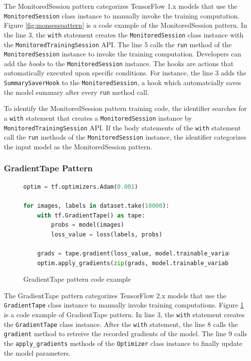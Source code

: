 The MonitoredSession pattern categorizes TensorFlow 1.x models that
use the {\tt MonitoredSession} class instance to manually invoke the 
training computation.
Figure \ref{fig:monsesspattern} is a code example of the MonitoredSession 
pattern.
In the line 3, the {\tt with} statement creates the {\tt MonitoredSession}
class instance with the {\tt MonitoredTrainingSession} API.
The line 5 calls the {\tt run} method of the {\tt MonitoredSession} instance 
to invoke the training computation.
Developers can add the \textit{hooks} to the
{\tt MonitoredSession} instance. The hooks are actions that automatically 
executed upon specific conditions. 
For instance, the line 3 adds the {\tt SummarySaverHook} to the
{\tt MonitoredSession}, a hook which automatcially saves the model summary 
after every {\tt run} method call.

To identify the MonitoredSession pattern training code,
the identifier searches for a {\tt with} statement that creates a
{\tt MonitoredSession} instance by {\tt MonitoredTrainingSession} API.
If the body statements of the {\tt with} statement call the {\tt run} methods 
of the {\tt MonitoredSession} instance, 
the identifier categorizes the input model as the MonitoredSession pattern. 


\subsubsection{GradientTape Pattern}

\begin{figure}[!ht]
  \begin{lstlisting}[language=Python]
optim = tf.optimizers.Adam(0.001)

for images, labels in dataset.take(10000):
    with tf.GradientTape() as tape:
        probs = model(images)
        loss_value = loss(labels, probs)

    grads = tape.gradient(loss_value, model.trainable_variables)
    optim.apply_gradients(zip(grads, model.trainable_variables))
  \end{lstlisting}
  \caption{GradientTape pattern code example}
  \label{fig:tapepattern}
\end{figure}


The GradientTape pattern categorizes TensorFlow 2.x models that
use the {\tt GradientTape} class instance to manually invoke training 
computations. Figure \ref{fig:tapepattern} is a code example of 
GradientTape pattern.
In line 3, the {\tt with} statement creates the {\tt GradientTape} class
instance. 
After the {\tt with} statement, the line 8 calls the {\tt gradient} method
to retreive the recorded gradients of the model.
The line 9 calls the {\tt apply\_gradients} methods of the {\tt Optimizer}
class instance to finally update the model parameters.

